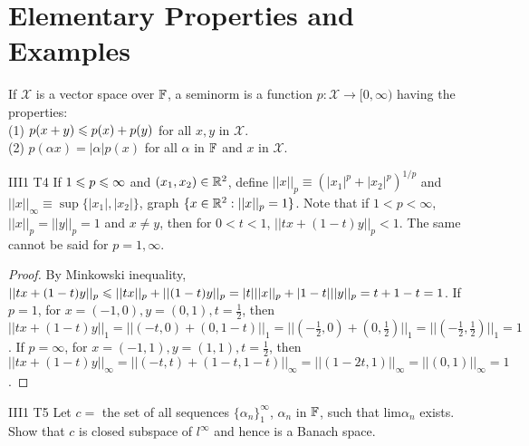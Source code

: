\chapter{Elementary Properties and Examples}\label{chp:3_1}

\begin{definition}
    If $\mathscr{X}$ is a vector space over $\mathbb{F}$,
    a seminorm is a function $p:\mathscr{X}\rightarrow [0,\infty)$ having the properties:\\
    (1) $p(x+y)\leqslant p(x)+p(y)$ for all $x,y$ in $\mathscr{X}$.\\
    (2) $p(\alpha x)=|\alpha|p(x)$ for all $\alpha$ in $\mathbb{F}$ and $x$ in $\mathscr{X}$.\\
    
\end{definition}


\begin{exercise}{III1 T4}{}
    If $1\leqslant p\leqslant \infty$ and $(x_1,x_2)\in\mathbb{R}^2$, 
    define $||x||_p\equiv (|x_1|^p+|x_2|^p)^{1/p}$ and $||x||_{\infty}\equiv \sup\{|x_1|,|x_2|\}$,
    graph $\{x\in\mathbb{R}^2:||x||_p=1\}$. Note that if $1<p<\infty$, $||x||_p=||y||_p=1$ and $x\neq y$, 
    then for $0<t<1$, $||tx+(1-t)y||_p<1$.
    The same cannot be said for $p=1,\infty$.
\end{exercise}

\begin{proof}
    By Minkowski inequality, $||tx+(1-t)y||_p\leqslant ||tx||_p+||(1-t)y||_p=|t|||x||_p+|1-t|||y||_p=t+1-t=1$.
    If $p=1$, for $x=(-1,0),y=(0,1),t=\frac{1}{2}$, 
    then $||tx+(1-t)y||_1=||(-t,0)+(0,1-t)||_1=||(-\frac{1}{2},0)+(0,\frac{1}{2})||_1=||(-\frac{1}{2},\frac{1}{2})||_1=1$.
    If $p=\infty$, for $x=(-1,1),y=(1,1),t=\frac{1}{2}$, 
    then $||tx+(1-t)y||_{\infty}=||(-t,t)+(1-t,1-t)||_{\infty}=||(1-2t,1)||_{\infty}=||(0,1)||_{\infty}=1$.
\end{proof}

\begin{exercise}{III1 T5}{}
    Let $c=$ the set of all sequences $\{\alpha_n\}_{1}^{\infty}$, 
    $\alpha_n$ in $\mathbb{F}$, such that lim$\alpha_n$ exists. 
    Show that $c$ is closed subspace of $l^{\infty}$ and hence is a Banach space.
\end{exercise}

